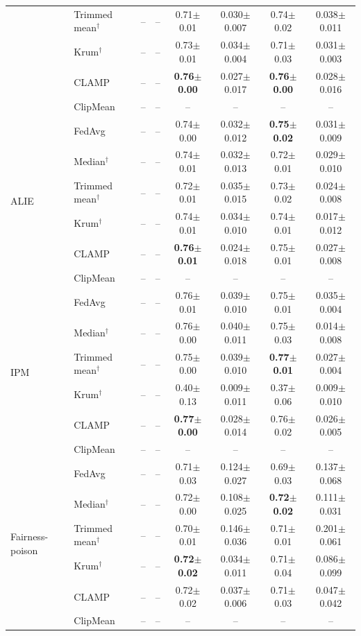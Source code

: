 \begin{table}[tbp]
\begin{tabular}{llcccccc}
 & Trimmed mean$^\dagger$ & -- & -- & 0.71$\pm$0.01 & 0.030$\pm$0.007 & 0.74$\pm$0.02 & 0.038$\pm$0.011 \\
 & Krum$^\dagger$ & -- & -- & 0.73$\pm$0.01 & 0.034$\pm$0.004 & 0.71$\pm$0.03 & 0.031$\pm$0.003 \\
 & CLAMP & -- & -- & \textbf{0.76$\pm$0.00} & 0.027$\pm$0.017 & \textbf{0.76$\pm$0.00} & 0.028$\pm$0.016 \\
 & ClipMean & -- & -- & -- & -- & -- & -- \\
\midrule
\multirow{6}{*}{ALIE} & FedAvg & -- & -- & 0.74$\pm$0.00 & 0.032$\pm$0.012 & \textbf{0.75$\pm$0.02} & 0.031$\pm$0.009 \\
 & Median$^\dagger$ & -- & -- & 0.74$\pm$0.01 & 0.032$\pm$0.013 & 0.72$\pm$0.01 & 0.029$\pm$0.010 \\
 & Trimmed mean$^\dagger$ & -- & -- & 0.72$\pm$0.01 & 0.035$\pm$0.015 & 0.73$\pm$0.02 & 0.024$\pm$0.008 \\
 & Krum$^\dagger$ & -- & -- & 0.74$\pm$0.01 & 0.034$\pm$0.010 & 0.74$\pm$0.01 & 0.017$\pm$0.012 \\
 & CLAMP & -- & -- & \textbf{0.76$\pm$0.01} & 0.024$\pm$0.018 & 0.75$\pm$0.01 & 0.027$\pm$0.008 \\
 & ClipMean & -- & -- & -- & -- & -- & -- \\
\midrule
\multirow{6}{*}{IPM} & FedAvg & -- & -- & 0.76$\pm$0.01 & 0.039$\pm$0.010 & 0.75$\pm$0.01 & 0.035$\pm$0.004 \\
 & Median$^\dagger$ & -- & -- & 0.76$\pm$0.00 & 0.040$\pm$0.011 & 0.75$\pm$0.03 & 0.014$\pm$0.008 \\
 & Trimmed mean$^\dagger$ & -- & -- & 0.75$\pm$0.00 & 0.039$\pm$0.010 & \textbf{0.77$\pm$0.01} & 0.027$\pm$0.004 \\
 & Krum$^\dagger$ & -- & -- & 0.40$\pm$0.13 & 0.009$\pm$0.011 & 0.37$\pm$0.06 & 0.009$\pm$0.010 \\
 & CLAMP & -- & -- & \textbf{0.77$\pm$0.00} & 0.028$\pm$0.014 & 0.76$\pm$0.02 & 0.026$\pm$0.005 \\
 & ClipMean & -- & -- & -- & -- & -- & -- \\
\midrule
\multirow{6}{*}{Fairness-poison} & FedAvg & -- & -- & 0.71$\pm$0.03 & 0.124$\pm$0.027 & 0.69$\pm$0.03 & 0.137$\pm$0.068 \\
 & Median$^\dagger$ & -- & -- & 0.72$\pm$0.00 & 0.108$\pm$0.025 & \textbf{0.72$\pm$0.02} & 0.111$\pm$0.031 \\
 & Trimmed mean$^\dagger$ & -- & -- & 0.70$\pm$0.01 & 0.146$\pm$0.036 & 0.71$\pm$0.01 & 0.201$\pm$0.061 \\
 & Krum$^\dagger$ & -- & -- & \textbf{0.72$\pm$0.02} & 0.034$\pm$0.011 & 0.71$\pm$0.04 & 0.086$\pm$0.099 \\
 & CLAMP & -- & -- & 0.72$\pm$0.02 & 0.037$\pm$0.006 & 0.71$\pm$0.03 & 0.047$\pm$0.042 \\
 & ClipMean & -- & -- & -- & -- & -- & -- \\
\bottomrule
\end{tabular}
\end{table}
